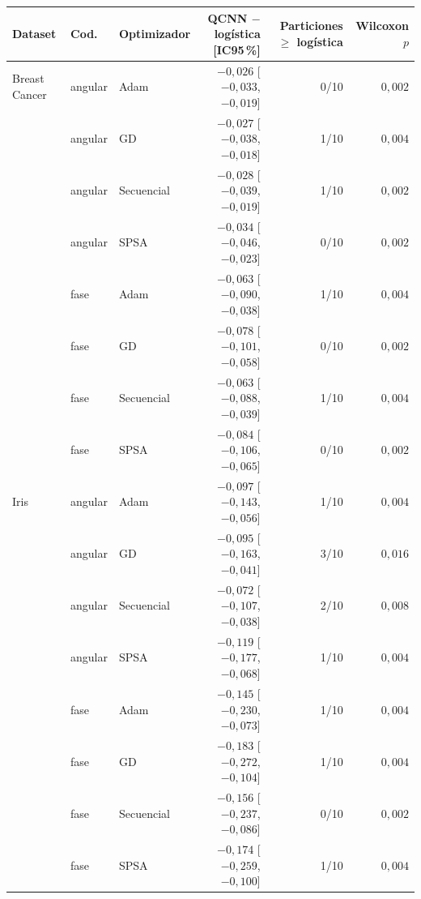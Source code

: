 \begin{tabular}{lllrrr}
\toprule
Dataset & Cod. & Optimizador & QCNN $-$ logística [IC95\,\%] & Particiones $\geq$ logística & Wilcoxon $p$ \\
\midrule
Breast Cancer & angular & Adam & $-0{,}026$ [$-0{,}033$, $-0{,}019$] & 0/10 & $0{,}002$ \\
 & angular & GD & $-0{,}027$ [$-0{,}038$, $-0{,}018$] & 1/10 & $0{,}004$ \\
 & angular & Secuencial & $-0{,}028$ [$-0{,}039$, $-0{,}019$] & 1/10 & $0{,}002$ \\
 & angular & SPSA & $-0{,}034$ [$-0{,}046$, $-0{,}023$] & 0/10 & $0{,}002$ \\
 & fase & Adam & $-0{,}063$ [$-0{,}090$, $-0{,}038$] & 1/10 & $0{,}004$ \\
 & fase & GD & $-0{,}078$ [$-0{,}101$, $-0{,}058$] & 0/10 & $0{,}002$ \\
 & fase & Secuencial & $-0{,}063$ [$-0{,}088$, $-0{,}039$] & 1/10 & $0{,}004$ \\
 & fase & SPSA & $-0{,}084$ [$-0{,}106$, $-0{,}065$] & 0/10 & $0{,}002$ \\
\midrule
Iris & angular & Adam & $-0{,}097$ [$-0{,}143$, $-0{,}056$] & 1/10 & $0{,}004$ \\
 & angular & GD & $-0{,}095$ [$-0{,}163$, $-0{,}041$] & 3/10 & $0{,}016$ \\
 & angular & Secuencial & $-0{,}072$ [$-0{,}107$, $-0{,}038$] & 2/10 & $0{,}008$ \\
 & angular & SPSA & $-0{,}119$ [$-0{,}177$, $-0{,}068$] & 1/10 & $0{,}004$ \\
 & fase & Adam & $-0{,}145$ [$-0{,}230$, $-0{,}073$] & 1/10 & $0{,}004$ \\
 & fase & GD & $-0{,}183$ [$-0{,}272$, $-0{,}104$] & 1/10 & $0{,}004$ \\
 & fase & Secuencial & $-0{,}156$ [$-0{,}237$, $-0{,}086$] & 0/10 & $0{,}002$ \\
 & fase & SPSA & $-0{,}174$ [$-0{,}259$, $-0{,}100$] & 1/10 & $0{,}004$ \\
\bottomrule
\end{tabular}
